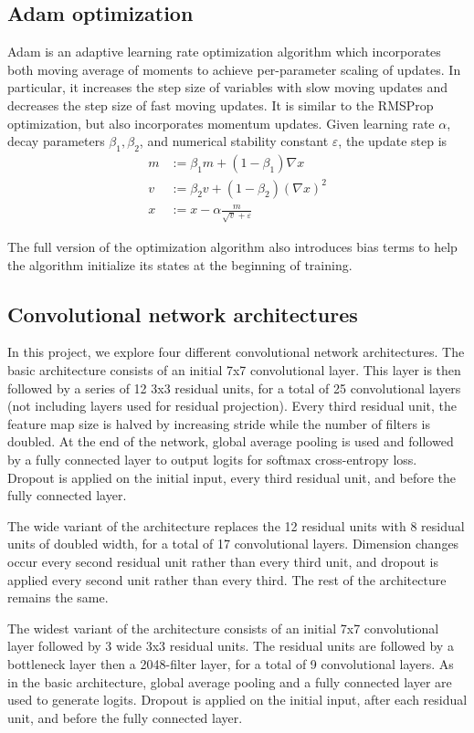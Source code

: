 \documentclass[10pt,twocolumn,letterpaper]{article}
\begin{document}
\subsection{Adam optimization}
Adam is an adaptive learning rate optimization algorithm which incorporates both moving average of moments to achieve per-parameter scaling of updates. In particular, it increases the step size of variables with slow moving updates and decreases the step size of fast moving updates. It is similar to the RMSProp optimization, but also incorporates momentum updates. Given learning rate $\alpha$, decay parameters $\beta_1, \beta_2$, and numerical stability constant $\varepsilon$, the update step is
\begin{align}
m &:= \beta_1 m + (1 - \beta_1) \nabla x \\
v &:= \beta_2 v + (1 - \beta_2) (\nabla x)^2 \\
x &:= x - \alpha \frac{m}{\sqrt{v} + \varepsilon}
\end{align}

The full version of the optimization algorithm also introduces bias terms to help the algorithm initialize its states at the beginning of training.

\subsection{Convolutional network architectures}
In this project, we explore four different convolutional network architectures. The basic architecture consists of an initial 7x7 convolutional layer. This layer is then followed by a series of 12 3x3 residual units, for a total of 25 convolutional layers (not including layers used for residual projection). Every third residual unit, the feature map size is halved by increasing stride while the number of filters is doubled. At the end of the network, global average pooling is used and followed by a fully connected layer to output logits for softmax cross-entropy loss. Dropout is applied on the initial input, every third residual unit, and before the fully connected layer.

The wide variant of the architecture replaces the 12 residual units with 8 residual units of doubled width, for a total of 17 convolutional layers. Dimension changes occur every second residual unit rather than every third unit, and dropout is applied every second unit rather than every third. The rest of the architecture remains the same.

The widest variant of the architecture consists of an initial 7x7 convolutional layer followed by 3 wide 3x3 residual units. The residual units are followed by a bottleneck layer then a 2048-filter layer, for a total of 9 convolutional layers. As in the basic architecture, global average pooling and a fully connected layer are used to generate logits. Dropout is applied on the initial input, after each residual unit, and before the fully connected layer.
\end{document}
